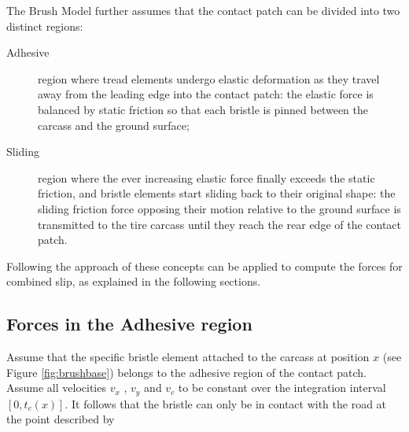 \documentclass[12pt,a4paper]{report}
\begin{document}
The Brush Model further assumes that the contact patch can be divided into two distinct regions:\label{patch:regions}
\begin{description}
\item[Adhesive] region where tread elements undergo elastic deformation as they travel away from the leading edge into the contact patch: the elastic force is balanced by static friction so that each bristle is pinned between the carcass and the ground surface;
\item[Sliding] region where the ever increasing elastic force finally exceeds the static friction, and bristle elements start sliding back to their original shape: the sliding friction force opposing their motion relative to the ground surface is transmitted to the tire carcass until they reach the rear edge of the contact patch.
\end{description}

Following the approach of \citep{nikravesh} these concepts can be applied to compute the forces for combined slip, as explained in the following sections.

\subsection*{Forces in the Adhesive region} \label{ssec:adhesiveforces}
Assume that the specific bristle element attached to the carcass at position $x$ (see Figure \ref{fig:brushbase}) belongs to the adhesive region of the contact patch. Assume all velocities $v_x$ , $v_y$ and $v_c$ to be constant over the integration interval $[0,t_c(x)]$.
It follows that the bristle can only be in contact with the road at the point described by
\end{document}
